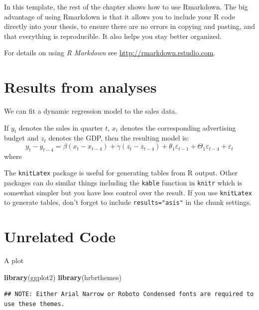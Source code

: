 \documentclass[oneside,12pt,a4paper,bibliography=totoc,numbers=noenddot,table]{scrreprt} %
\newenvironment{Shaded}{\begin{snugshade}}{\end{snugshade}}
\newcommand{\KeywordTok}[1]{\textcolor[rgb]{0.13,0.29,0.53}{\textbf{{#1}}}}
\newcommand{\NormalTok}[1]{{#1}}
\begin{document}
In this template, the rest of the chapter shows how to use Rmarkdown. The big advantage of using Rmarkdown is that it allows you to include your R code directly into your thesis, to ensure there are no errors in copying and pasting, and that everything is reproducible. It also helps you stay better organized.

For details on using \emph{R Markdown} see \url{http://rmarkdown.rstudio.com}.

\hypertarget{results-from-analyses}{%
\section{Results from analyses}\label{results-from-analyses}}

We can fit a dynamic regression model to the sales data.

If \(y_t\) denotes the sales in quarter \(t\), \(x_t\) denotes the corresponding advertising budget and \(z_t\) denotes the GDP, then the resulting model is:
\begin{equation}
  y_t - y_{t-4} = \beta (x_t-x_{t-4}) + \gamma (z_t-z_{t-4}) + \theta_1 \varepsilon_{t-1} + \Theta_1 \varepsilon_{t-4} + \varepsilon_t
\end{equation}
where

The \texttt{knitLatex} package is useful for generating tables from R output. Other packages can do similar things including the \texttt{kable} function in \texttt{knitr} which is somewhat simpler but you have less control over the result. If you use \texttt{knitLatex} to generate tables, don't forget to include \texttt{results="asis"} in the chunk settings.

\hypertarget{unrelated-code}{%
\section{Unrelated Code}\label{unrelated-code}}

A plot

\begin{Shaded}
\begin{Highlighting}[]
\KeywordTok{library}\NormalTok{(ggplot2)}
\KeywordTok{library}\NormalTok{(hrbrthemes)}
\end{Highlighting}
\end{Shaded}

\begin{verbatim}
## NOTE: Either Arial Narrow or Roboto Condensed fonts are required to use these themes.
\end{verbatim}
\end{document}
